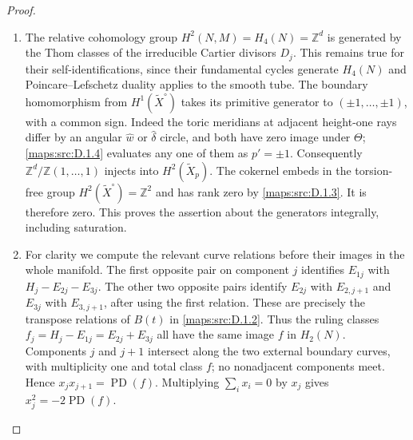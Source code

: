 \begin{proof}
\begin{enumerate}[label=\arabic*.,leftmargin=*]
\item The relative cohomology group $H^2(N,M)=H_4(N)=\mathbb Z^d$ is
generated by the Thom classes of the irreducible Cartier divisors $D_j$.
This remains true for their self-identifications, since their fundamental
cycles generate $H_4(N)$ and Poincare--Lefschetz duality applies to the
smooth tube. The boundary homomorphism from $H^1(\widetilde X^\circ)$
takes its primitive generator to $(\pm1,\ldots,\pm1)$, with a common
sign. Indeed the toric meridians at adjacent height-one rays differ by
an angular $\widehat w$ or $\widehat\delta$ circle, and both have
zero image under $\Theta$; \ref{maps:src:D.1.4} evaluates any one of them as $p'=\pm1$.
Consequently $\mathbb Z^d/\mathbb Z(1,\ldots,1)$ injects into
$H^2(\widetilde X_p)$. The cokernel embeds in the torsion-free group
$H^2(\widetilde X^\circ)=\mathbb Z^2$ and has rank zero by \ref{maps:src:D.1.3}.
It is therefore zero. This proves the assertion about the generators
integrally, including saturation.

\item For clarity we compute the relevant curve relations before their
images in the whole manifold. The first opposite pair on component
$j$ identifies $E_{1j}$ with $H_j-E_{2j}-E_{3j}$. The other two
opposite pairs identify $E_{2j}$ with $E_{2,j+1}$ and $E_{3j}$ with
$E_{3,j+1}$, after using the first relation. These are precisely the
transpose relations of $B(t)$ in \ref{maps:src:D.1.2}. Thus the ruling classes
$f_j=H_j-E_{1j}=E_{2j}+E_{3j}$ all have the same image $f$ in
$H_2(N)$. Components $j$ and $j+1$ intersect along the two external
boundary curves, with multiplicity one and total class $f$; no
nonadjacent components meet. Hence $x_jx_{j+1}=\operatorname{PD}(f)$.
Multiplying $\sum_ix_i=0$ by $x_j$ gives $x_j^2=-2\operatorname{PD}(f)$.


\end{enumerate}
\end{proof}
